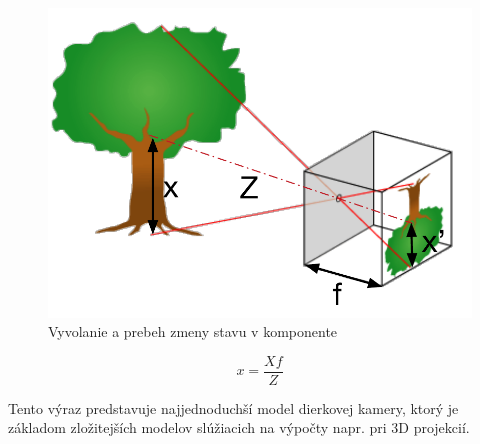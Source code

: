 \begin{figure}[H]
\begin{left}
	\includegraphics[scale=0.4]{obrazky/dierkovaKamera}
	\caption{Vyvolanie a prebeh zmeny stavu v komponente}
	\end{left}
\end{figure}

$$\textit{x}=\frac{X\textit{f}}{Z}$$

Tento výraz predstavuje najjednoduchší model dierkovej kamery, ktorý je základom zložitejších modelov slúžiacich na výpočty napr. pri 3D projekcií. 

